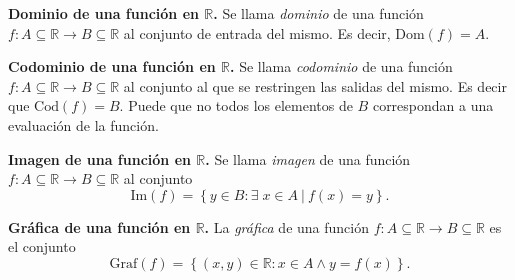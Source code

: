 \begin{definition}\textbf{Dominio de una función en $\mathbb{R}$.}
    Se llama \textit{dominio} de una función \newline$f: A \subseteq \mathbb{R} \rightarrow B \subseteq \mathbb{R}$
    al conjunto de entrada del mismo. Es decir, $\text{Dom}(f)=A$.
\end{definition}
\begin{definition}\textbf{Codominio de una función en $\mathbb{R}$.}
    Se llama \textit{codominio} de una función \newline $f: A \subseteq \mathbb{R} \rightarrow B \subseteq \mathbb{R}$
    al conjunto al que se restringen las salidas del mismo. Es decir que $\text{Cod}(f)=B$.
    Puede que no todos los elementos de $B$ correspondan a una evaluación de la función.
\end{definition}
\begin{definition}\textbf{Imagen de una función en $\mathbb{R}$.}
    Se llama \textit{imagen} de una función \newline $f: A \subseteq \mathbb{R} \rightarrow B \subseteq \mathbb{R}$ 
    al conjunto 
    \begin{equation*}
        \text{Im}(f) = \left\{ y\in B: \exists\;x\in A\:|\:f(x)=y \right\}.    
    \end{equation*}
\end{definition}
\begin{definition}\textbf{Gráfica de una función en $\mathbb{R}$.}
    La \textit{gráfica} de una función $f: A \subseteq \mathbb{R} \rightarrow B \subseteq \mathbb{R}$ es
    el conjunto
    \begin{equation*}
        \text{Graf}(f) = \left\{ (x,y)\in \mathbb{R}: x \in A \land y=f(x)\right\}.    
    \end{equation*}
\end{definition}
